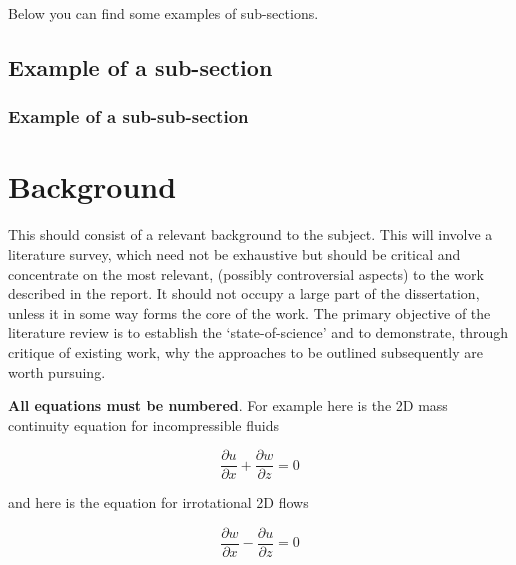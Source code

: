 \documentclass[a4paper,12pt]{article}
\begin{document}
Below you can find some examples of sub-sections.

\subsection{Example of a sub-section}
\label{sec:ExampleSubSection}

\subsubsection{Example of a sub-sub-section}
\label{sec:ExampleSubSubSection}


\clearpage


\section{Background}
\label{sec:background}

This should consist of a relevant background to the subject. This will involve a literature survey, which need not be exhaustive but should be critical and concentrate on the most relevant, (possibly controversial aspects) to the work described in the report. It should not occupy a large part of the dissertation, unless it in some way forms the core of the work. The primary objective of the literature review is to establish the ‘state-of-science’ and to demonstrate, through critique of existing work, why the approaches to be outlined subsequently are worth pursuing.

\textbf{All equations must be numbered}. For example here is the 2D mass continuity equation for incompressible fluids


\begin{equation}
  \label{eq:mass-continuity}
  \frac{\partial u}{\partial x} + \frac{\partial w}{\partial z} = 0
\end{equation}

and here is the equation for irrotational 2D flows

\begin{equation}
  \label{eq:irrotationality}
  \frac{\partial w}{\partial x} - \frac{\partial u}{\partial z} = 0
\end{equation}


\clearpage


\end{document}
